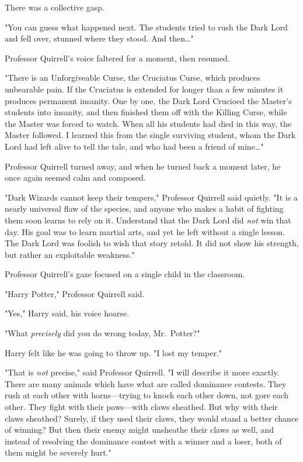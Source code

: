There was a collective gasp.

"You can guess what happened next. The students tried to rush the Dark Lord and 
fell over, stunned where they stood. And then{\ldots}"

Professor Quirrell's voice faltered for a moment, then resumed.

"There is an Unforgiveable Curse, the Cruciatus Curse, which produces 
unbearable pain. If the Cruciatus is extended for longer than a few minutes it 
produces permanent insanity. One by one, the Dark Lord Crucioed the Master's 
students into insanity, and then finished them off with the Killing Curse, 
while the Master was forced to watch. When all his students had died in this 
way, the Master followed. I learned this from the single surviving student, 
whom the Dark Lord had left alive to tell the tale, and who had been a friend 
of mine{\ldots}"

Professor Quirrell turned away, and when he turned back a moment later, he once 
again seemed calm and composed.

"Dark Wizards cannot keep their tempers," Professor Quirrell said quietly. "It 
is a nearly universal flaw of the species, and anyone who makes a habit of 
fighting them soon learns to rely on it. Understand that the Dark Lord did 
\emph{not} win that day. His goal was to learn martial arts, and yet he left 
without a single lesson. The Dark Lord was foolish to wish that story retold. 
It did not show his strength, but rather an exploitable weakness."

Professor Quirrell's gaze focused on a single child in the classroom.

"Harry Potter," Professor Quirrell said.

"Yes," Harry said, his voice hoarse.

"What \emph{precisely} did you do wrong today, Mr.~Potter?"

Harry felt like he was going to throw up. "I lost my temper."

"That is \emph{not} precise," said Professor Quirrell. "I will describe it more 
exactly. There are many animals which have what are called dominance contests. 
They rush at each other with horns---trying to knock each other down, not gore 
each other. They fight with their paws---with claws sheathed. But why with 
their claws sheathed? Surely, if they used their claws, they would stand a 
better chance of winning? But then their enemy might unsheathe their claws as 
well, and instead of resolving the dominance contest with a winner and a loser, 
both of them might be severely hurt."

